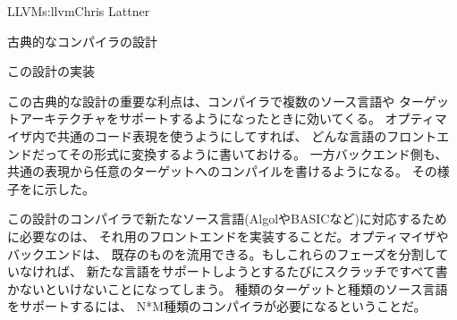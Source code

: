 \begin{aosachapter}{LLVM}{s:llvm}{Chris Lattner}
\begin{aosasect1}{古典的なコンパイラの設計}
\begin{aosasect2}{この設計の実装}

この古典的な設計の重要な利点は、コンパイラで複数のソース言語や
ターゲットアーキテクチャをサポートするようになったときに効いてくる。
オプティマイザ内で共通のコード表現を使うようにしてすれば、
どんな言語のフロントエンドだってその形式に変換するように書いておける。
一方バックエンド側も、共通の表現から任意のターゲットへのコンパイルを書けるようになる。
その様子をに示した。


この設計のコンパイラで新たなソース言語(AlgolやBASICなど)に対応するために必要なのは、
それ用のフロントエンドを実装することだ。オプティマイザやバックエンドは、
既存のものを流用できる。もしこれらのフェーズを分割していなければ、
新たな言語をサポートしようとするたびにスクラッチですべて書かないといけないことになってしまう。
種類のターゲットと種類のソース言語をサポートするには、
N*M種類のコンパイラが必要になるということだ。


\end{aosasect2}
\end{aosasect1}
\end{aosachapter}
